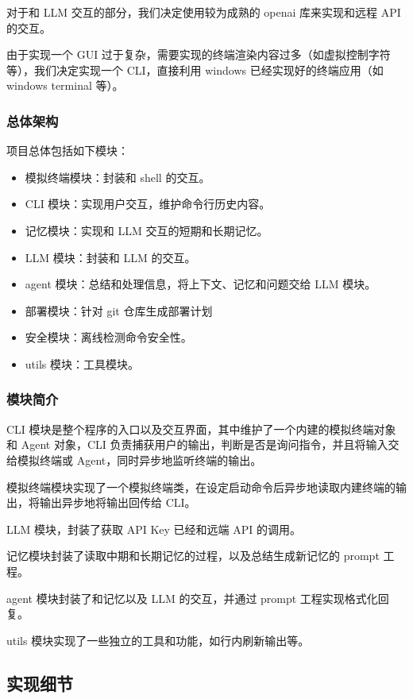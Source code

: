 \documentclass{article}
\theoremstyle{plain}
\theoremstyle{definition}
\theoremstyle{remark}
\begin{document}
对于和 LLM 交互的部分，我们决定使用较为成熟的 openai 库来实现和远程 API 的交互。

由于实现一个 GUI 过于复杂，需要实现的终端渲染内容过多（如虚拟控制字符等），我们决定实现一个 CLI，直接利用 windows 已经实现好的终端应用（如 windows terminal 等）。

\subsubsection{总体架构}

项目总体包括如下模块：

\begin{itemize}
    \setlength{\itemsep}{0.1em}
    \setlength{\parskip}{0.1em}
    \item 模拟终端模块：封装和 shell 的交互。
    \item CLI 模块：实现用户交互，维护命令行历史内容。
    \item 记忆模块：实现和 LLM 交互的短期和长期记忆。
    \item LLM 模块：封装和 LLM 的交互。
    \item agent 模块：总结和处理信息，将上下文、记忆和问题交给 LLM 模块。
    \item 部署模块：针对 git 仓库生成部署计划
    \item 安全模块：离线检测命令安全性。
    \item utils 模块：工具模块。
\end{itemize}

\subsubsection{模块简介}

CLI 模块是整个程序的入口以及交互界面，其中维护了一个内建的模拟终端对象和 Agent 对象，CLI 负责捕获用户的输出，判断是否是询问指令，并且将输入交给模拟终端或 Agent，同时异步地监听终端的输出。

模拟终端模块实现了一个模拟终端类，在设定启动命令后异步地读取内建终端的输出，将输出异步地将输出回传给 CLI。

LLM 模块，封装了获取 API Key 已经和远端 API 的调用。

记忆模块封装了读取中期和长期记忆的过程，以及总结生成新记忆的 prompt 工程。

agent 模块封装了和记忆以及 LLM 的交互，并通过 prompt 工程实现格式化回复。

utils 模块实现了一些独立的工具和功能，如行内刷新输出等。

\subsection{实现细节}
\end{document}

